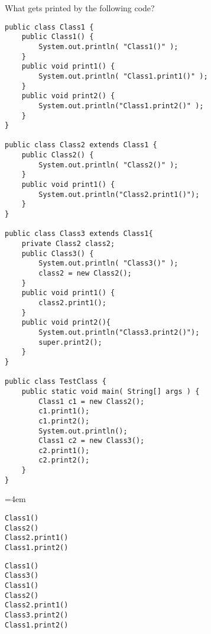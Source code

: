 %
%


What gets printed by the following code?
\begin{lstlisting}
public class Class1 {
	public Class1() {
		System.out.println( "Class1()" );
	}
	public void print1() {
		System.out.println( "Class1.print1()" );
	}
	public void print2() {
		System.out.println("Class1.print2()" );
	}
}

public class Class2 extends Class1 {
	public Class2() {
		System.out.println( "Class2()" );
	}
	public void print1() {
		System.out.println("Class2.print1()");
	}
}

public class Class3 extends Class1{
	private Class2 class2;
	public Class3() {
		System.out.println( "Class3()" );
		class2 = new Class2();
	}
	public void print1() {
		class2.print1();
	}
	public void print2(){
		System.out.println("Class3.print2()");
		super.print2();
	}
}

public class TestClass {
	public static void main( String[] args ) {
		Class1 c1 = new Class2();
		c1.print1();
		c1.print2();
		System.out.println();
		Class1 c2 = new Class3();
		c2.print1();
		c2.print2();
	}
}
\end{lstlisting}
\begin{answer}
\begin{multicols}{2}
\hangindent=4em
    \begin{verbatim}
Class1()
Class2()
Class2.print1()
Class1.print2()
\end{verbatim}
\columnbreak
\begin{verbatim}
Class1()
Class3()
Class1()
Class2()
Class2.print1()
Class3.print2()
Class1.print2()
    \end{verbatim}
\end{multicols}
\end{answer}

\vspace{-24pt}